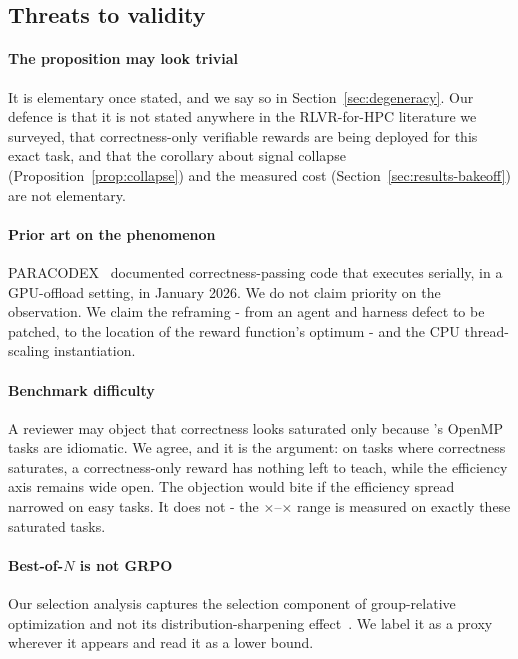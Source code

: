 \subsection{Threats to validity}

\paragraph*{The proposition may look trivial}
It is elementary once stated, and we say so in Section~\ref{sec:degeneracy}.
Our defence is that it is not stated anywhere in the RLVR-for-HPC literature
we surveyed, that correctness-only verifiable rewards are being deployed for
this exact task, and that the corollary about signal collapse
(Proposition~\ref{prop:collapse}) and the measured cost
(Section~\ref{sec:results-bakeoff}) are not elementary.

\paragraph*{Prior art on the phenomenon}
PARACODEX~\cite{paracodex} documented correctness-passing code that executes
serially, in a GPU-offload setting, in January 2026. We do not claim priority
on the observation. We claim the reframing - from an agent and harness defect
to be patched, to the location of the reward function's optimum - and the CPU
thread-scaling instantiation.

\paragraph*{Benchmark difficulty}
A reviewer may object that correctness looks saturated only because
\ParEval's OpenMP tasks are idiomatic. We agree, and it is the argument: on
tasks where correctness saturates, a correctness-only reward has nothing left
to teach, while the efficiency axis remains wide open. The objection would
bite if the efficiency spread narrowed on easy tasks. It does not - the
\SpeedMin$\times$--\SpeedMax$\times$ range is measured on exactly these
saturated tasks.

\paragraph*{Best-of-$N$ is not GRPO}
Our selection analysis captures the selection component of group-relative
optimization and not its distribution-sharpening
effect~\cite{bonmaxk,rewardunlikely}. We label it as a proxy wherever it
appears and read it as a lower bound.

